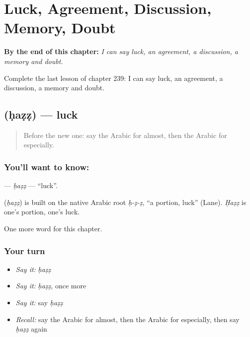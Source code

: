 
\chapter{Luck, Agreement, Discussion, Memory, Doubt}
\label{ch:ar-luck-agreement-discussion-memory-doubt}

\begin{chapteropening}
\textbf{By the end of this chapter:} \emph{I can say luck, an agreement, a discussion, a memory and doubt.}

Complete the last lesson of chapter 239: I can say luck, an agreement, a discussion, a memory and doubt.
\end{chapteropening}

\section[\texorpdfstring{\ar{حظ} (ḥaẓẓ)}{حظ (ḥaẓẓ)}]{ (ḥaẓẓ) — luck}

\label{lesson:AR-C239-hazz}



\begin{quote}
Before the new one: say the Arabic for almost, then the Arabic for especially.
\end{quote}

\subsection*{You'll want to know: }
\textbf{} — \emph{ḥaẓẓ} — \textquotedblleft{}luck\textquotedblright{}.

\begin{cousinweb}
\textbf{} (\emph{ḥaẓẓ}) is built on the native Arabic root \emph{ḥ-ẓ-ẓ}, \textquotedblleft{}a portion, luck\textquotedblright{} (Lane). \emph{Ḥaẓẓ} is one's portion, one's luck.
\end{cousinweb}

\begin{grammarlens}[title={What you've built}]
One more word for this chapter.
\end{grammarlens}

\subsection*{Your turn}
\begin{itemize}
\raggedright
  \item \emph{Say it:} \emph{ḥaẓẓ}
  \item \emph{Say it:} \emph{ḥaẓẓ}, once more
  \item \emph{Say it:} say \emph{ḥaẓẓ}
  \item \emph{Recall:} say the Arabic for almost, then the Arabic for especially, then say \emph{ḥaẓẓ} again
\end{itemize}

